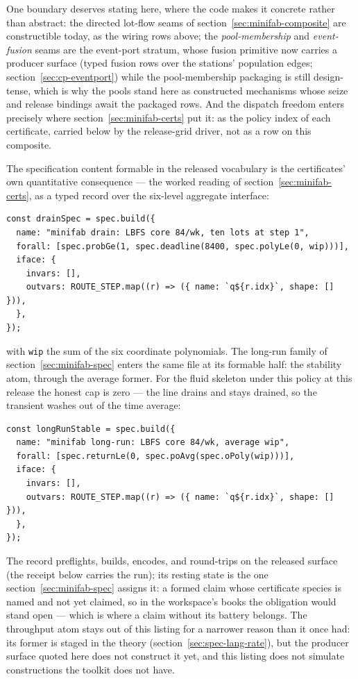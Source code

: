 \noindent One boundary deserves stating here, where the code makes it
concrete rather than abstract: the directed lot-flow seams of
section~\ref{sec:minifab-composite} are constructible today, as the
wiring rows above; the \emph{pool-membership} and
\emph{event-fusion} seams are
the event-port stratum, whose fusion primitive now carries a
producer surface (typed fusion rows over the stations' population
edges; section~\ref{sec:cp-eventport}) while the pool-membership
packaging is still design-tense, which is why the pools stand here
as constructed mechanisms whose seize and release bindings await
the packaged rows. And the dispatch freedom enters precisely where
section~\ref{sec:minifab-certs} put it: as the policy index of each
certificate, carried below by the release-grid driver, not as a row
on this composite.

The specification content formable in the released vocabulary is the
certificates' own quantitative consequence --- the worked reading of
section~\ref{sec:minifab-certs}, as a typed record over the
six-level aggregate interface:

\begin{Verbatim}[fontsize=\small,frame=leftline,rulecolor=\color{accentmid},framesep=3mm,xleftmargin=3mm]
const drainSpec = spec.build({
  name: "minifab drain: LBFS core 84/wk, ten lots at step 1",
  forall: [spec.probGe(1, spec.deadline(8400, spec.polyLe(0, wip)))],
  iface: {
    invars: [],
    outvars: ROUTE_STEP.map((r) => ({ name: `q${r.idx}`, shape: [] })),
  },
});
\end{Verbatim}

\noindent with \texttt{wip} the sum of the six coordinate
polynomials. The long-run family of
section~\ref{sec:minifab-spec} enters the same file at its formable
half: the stability atom, through the average former. For the fluid
skeleton under this policy at this release the honest cap is zero
--- the line drains and stays drained, so the transient washes out
of the time average:

\begin{Verbatim}[fontsize=\small,frame=leftline,rulecolor=\color{accentmid},framesep=3mm,xleftmargin=3mm]
const longRunStable = spec.build({
  name: "minifab long-run: LBFS core 84/wk, average wip",
  forall: [spec.returnLe(0, spec.poAvg(spec.oPoly(wip)))],
  iface: {
    invars: [],
    outvars: ROUTE_STEP.map((r) => ({ name: `q${r.idx}`, shape: [] })),
  },
});
\end{Verbatim}

\noindent The record preflights, builds, encodes, and round-trips
on the released surface (the receipt below carries the run); its
resting state is the one section~\ref{sec:minifab-spec} assigns it:
a formed claim whose certificate species is named and not yet
claimed, so in the workspace's books the obligation would stand
open --- which is where a claim without its battery belongs. The
throughput atom stays out of this listing for a narrower reason
than it once had: its former is staged in the theory
(section~\ref{sec:spec-lang-rate}), but the producer surface
quoted here does not construct it yet, and this listing does not
simulate constructions the toolkit does not have.

